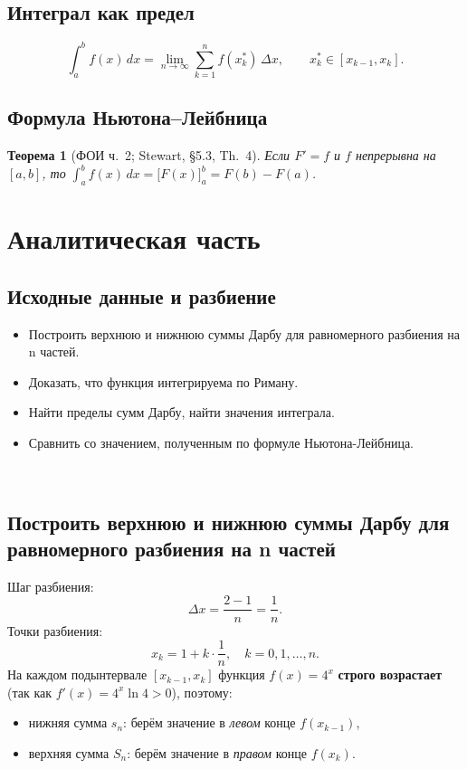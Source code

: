 \documentclass[12pt,a4paper]{article}
\newtheorem{theorem}{Теорема}
\begin{document}
\subsection{Интеграл как предел}
\[
  \int_a^b f(x)\,dx=\lim_{n\to\infty}\sum_{k=1}^{n}f(x_k^*)\,\Delta x,
  \qquad x_k^*\in[x_{k-1},x_k].
\]

\subsection{Формула Ньютона--Лейбница}
\begin{theorem}[ФОИ ч.~2; Stewart, \S 5.3, Th.~4]
Если $F'=f$ и $f$ непрерывна на $[a,b]$, то
$\int_a^b f(x)\,dx=\bigl[F(x)\bigr]_a^b=F(b)-F(a)$.
\end{theorem}

\section{Аналитическая часть}

\subsection*{Исходные данные и разбиение}
\begin{itemize}
\item Построить верхнюю и нижнюю суммы Дарбу для равномерного разбиения на n частей.
\item Доказать, что функция интегрируема по Риману.
\item Найти пределы сумм Дарбу, найти значения интеграла.
\item Сравнить со значением, полученным по формуле Ньютона-Лейбница.
\end{itemize}\\
\subsection{Построить верхнюю и нижнюю суммы Дарбу для равномерного разбиения на n частей}

Шаг разбиения:
\[
  \Delta x = \frac{2-1}{n} = \frac{1}{n}.
\]
Точки разбиения:
\[
  x_k = 1+k\cdot\frac{1}{n},\quad k=0,1,\ldots,n.
\]
На каждом подынтервале $[x_{k-1},x_k]$ функция $f(x)=4^x$ \textbf{строго возрастает}
(так как $f'(x)=4^x\ln 4>0$), поэтому:
\begin{itemize}
  \item нижняя сумма $s_n$: берём значение в \emph{левом} конце $f(x_{k-1})$,
  \item верхняя сумма $S_n$: берём значение в \emph{правом} конце $f(x_k)$.
\end{itemize}
\end{document}
